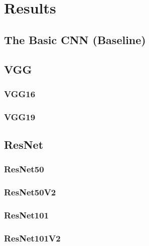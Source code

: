 \documentclass[12pt]{article}
\numberwithin{equation}{subsection}
\begin{document}
\section{Results}
\label{Results}


\subsection{The Basic CNN (Baseline)}
\label{res_basic_cnn}



\subsection{VGG}



\subsubsection{VGG16}
\label{vgg_16_res}



\subsubsection{VGG19}


\subsection{ResNet}

\label{res_ResNet}

\subsubsection{ResNet50}


\subsubsection{ResNet50V2}


\subsubsection{ResNet101}


\subsubsection{ResNet101V2}

\end{document}
